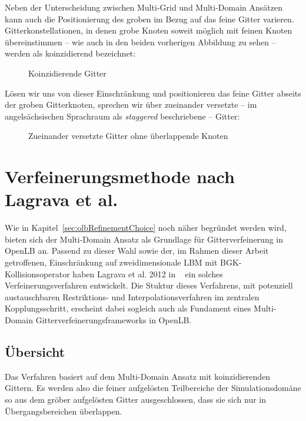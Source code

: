 Neben der Unterscheidung zwischen Multi-Grid und Multi-Domain Ansätzen kann auch die Positionierung des groben im Bezug auf das feine Gitter varieren. Gitterkonstellationen, in denen grobe Knoten soweit möglich mit feinen Knoten übereinstimmen -- wie auch in den beiden vorherigen Abbildung zu sehen -- werden als koinzidierend bezeichnet:

\begin{figure}[h]
\centering

\caption{Koinzidierende Gitter}
\label{fig:CoincidingGrid}
\end{figure}

\noindent
Lösen wir uns von dieser Einschränkung und positionieren das feine Gitter abseits der groben Gitterknoten, sprechen wir über zueinander versetzte -- im angelsächsischen Sprachraum als \emph{staggered} beschriebene -- Gitter:

\begin{figure}[h]
\centering

\caption{Zueinander versetzte Gitter ohne überlappende Knoten}
\label{fig:StaggeredGrid}
\end{figure}

\newpage
\section{Verfeinerungsmethode nach Lagrava et al.}

Wie in Kapitel~\ref{sec:olbRefinementChoice} noch näher begründet werden wird, bieten sich der Multi-Domain Ansatz als Grundlage für Gitterverfeinerung in OpenLB an. Passend zu dieser Wahl sowie der, im Rahmen dieser Arbeit getroffenen, Einschränkung auf zweidimensionale LBM mit BGK-Kollisionsoperator haben Lagrava et al. 2012 in ~\cite{lagrava12} ein solches Verfeinerungsverfahren entwickelt. Die Stuktur dieses Verfahrens, mit potenziell austauschbaren Restriktions- und Interpolationsverfahren im zentralen Kopplungsschritt, erscheint dabei sogleich auch als Fundament eines Multi-Domain Gitterverfeinerungsframeworks in OpenLB.

\subsection{Übersicht}

Das Verfahren basiert auf dem Multi-Domain Ansatz \cite[Kap.~3.1]{lagrava12} mit koinzidierenden Gittern. Es werden also die feiner aufgelösten Teilbereiche der Simulationsdomäne so aus dem gröber aufgelösten Gitter ausgeschlossen, dass sie sich nur in Übergangsbereichen überlappen.

